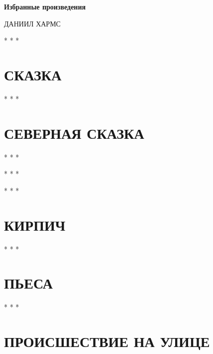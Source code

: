 \documentclass[a4paper,12pt]{article}
\begin{document}
\begin{center}
{\Large\bfseries Избранные произведения}
\end{center}

\vspace{0.5cm}

\begin{center}
{\large ДАНИИЛ ХАРМС}
\end{center}

\vspace{1cm}





\vspace{0.5cm}
\begin{center}
* * *
\end{center}

\section{СКАЗКА}


\vspace{0.5cm}
\begin{center}
* * *
\end{center}

\section{СЕВЕРНАЯ СКАЗКА}


\vspace{0.5cm}
\begin{center}
* * *
\vspace{1em}
\end{center}




\vspace{0.5cm}
\begin{center}
* * *
\end{center}



\begin{center}
* * *
\end{center}


\section{КИРПИЧ}


\vspace{0.5cm}
\begin{center}
* * *
\end{center}

\section{ПЬЕСА}


\vspace{0.5cm}
\begin{center}
* * *
\end{center}

\section{ПРОИСШЕСТВИЕ НА УЛИЦЕ}


\vspace{0.5cm}
\end{document}
